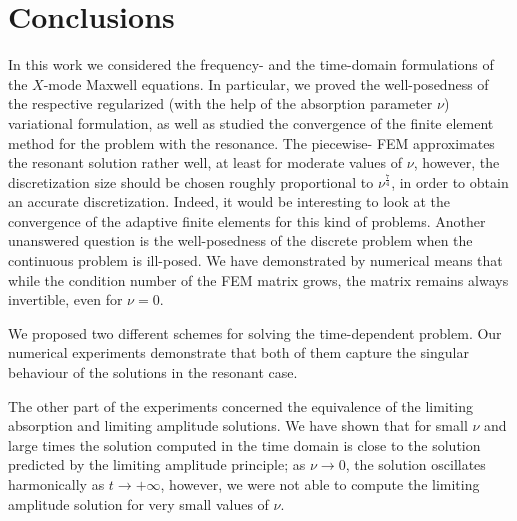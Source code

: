 \section{Conclusions}
In this work we considered the frequency- and the time-domain formulations of the $X$-mode Maxwell equations. 
In particular, we proved the well-posedness of the respective regularized (with the help of 
the absorption parameter $\nu$) variational formulation, as 
well as studied the convergence of the finite element method for the problem with the resonance. 
The piecewise- FEM approximates the resonant solution rather well, at least for moderate values of $\nu$, 
however, the discretization size should be chosen roughly proportional to $\nu^{\frac{7}{4}}$, in order to obtain an accurate discretization.
Indeed, it would be interesting to look at the convergence of the adaptive finite elements for this kind of problems. 
Another unanswered question is the well-posedness of the discrete problem when the continuous problem is ill-posed. We have 
demonstrated by numerical means that while the condition number of the FEM matrix grows, the matrix remains always invertible, even for $\nu=0$. 

We proposed two different schemes for solving the time-dependent problem. 
Our numerical experiments demonstrate that both of them capture the singular behaviour of the solutions in the resonant case.

The other part of the experiments concerned the equivalence of the limiting absorption and limiting amplitude solutions. We have shown 
that for small $\nu$ and large times the solution computed in the time domain is close to the solution predicted by the limiting amplitude principle; as 
$\nu\rightarrow 0$, the solution oscillates harmonically as $t\rightarrow +\infty$, however, we were not able to compute the limiting amplitude solution for very 
small values of $\nu$. 